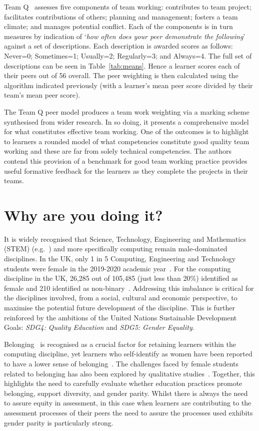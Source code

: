 \documentclass[sigconf, anonymous=true]{acmart}
\begin{document}
Team Q~\cite{Britton2017} assesses five components of team working:
contributes to team project; facilitates contributions of others;
planning and management; fosters a team climate; and manages potential
conflict. Each of the components is in turn measures by indication of
`{\emph{how often does your peer demonstrate the following}}' against
a set of descriptions. Each description is awarded scores as follows:
Never=0; Sometimes=1; Usually=2; Regularly=3; and Always=4. The
full set of descriptions can be seen in Table~\ref{tab:means}. Hence a
learner scores each of their peers out of 56 overall. The peer
weighting is then calculated using the algorithm indicated previously
(with a learner's mean peer score divided by their team's mean peer
score).
  
The Team Q peer model produces a team work weighting via a marking
scheme synthesised from wider research. In so doing, it presents a
comprehensive model for what constitutes effective team working. One
of the outcomes is to highlight to learners a rounded model of what
competencies constitute good quality team working and these are far
from solely technical competencies. The authors contend this provision
of a benchmark for good team working practice provides useful
formative feedback for the learners as they complete the projects in
their teams.

\section{Why are you doing it?}
It is widely recognised that Science, Technology, Engineering and
Mathematics (STEM) (e.g.~\cite{Baird2018}) and more specifically
computing remain male-dominated disciplines. In the UK, only 1 in 5
Computing, Engineering and Technology students were female in the
2019-2020 academic year~\cite{HESA}. For the computing discipline in
the UK, 26,285 out of 105,485 (just less than 20\%) identified as
female and 210 identified as non-binary~\cite{HESA}. Addressing this
imbalance is critical for the disciplines involved, from a social,
cultural and economic perspective, to maximise the potential future
development of the discipline. This is further reinforced by the
ambitions of the United Nations Sustainable Development Goals:
{\emph{SDG4: Quality Education}} and {\emph{SDG5: Gender Equality}}.

Belonging~\cite{Veilleux2013} is recognised as a crucial factor for
retaining learners within the computing discipline, yet learners who
self-identify as women have been reported to have a lower sense of
belonging~\cite{Mooney2020}. The challenges faced by female students
related to belonging has also been explored by qualitative
studies~\cite{Winter2021}. Together, this highlights the need to
carefully evaluate whether education practices promote belonging,
support diversity, and gender parity. Whilst there is always the need
to assure equity in assessment, in this case when learners are
contributing to the assessment processes of their peers the need to
assure the processes used exhibits gender parity is particularly
strong.
\end{document}
